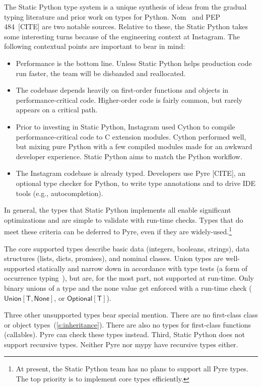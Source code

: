 \documentclass[english,cleveref,submission]{programming}
\newcommand{\SP}{Static Python}
\newcommand{\typefont}[1]{\mathsf{#1}}
\newcommand{\paramtype}[2]{#1[#2]}
\newcommand{\sptype}{\typefont{T}}
\newcommand{\sptnone}{\typefont{None}}
\newcommand{\sptoptional}[1]{\paramtype{\typefont{Optional}}{#1}}
\newcommand{\sptunion}[1]{\paramtype{\typefont{Union}}{#1}}
\begin{document}
The \SP{} type system is a unique synthesis of ideas from the gradual typing literature
and prior work on types for Python.
Nom~\cite{mt-oopsla-2017,mt-oopsla-2021} and PEP 484~[CITE] are two notable sources.
Relative to these, the \SP{} takes some interesting turns
because of the engineering context at Instagram.
The following contextual points are important to bear in mind:
\begin{itemize}
  \item
    Performance is the bottom line.
    Unless \SP{} helps production code run faster, the team will be disbanded
    and reallocated.
  \item
    The codebase depends heavily on first-order functions and objects in
    performance-critical code.
    Higher-order code is fairly common, but rarely appears on a critical path.
  \item
    Prior to investing in \SP{}, Instagram used Cython to compile
    performance-critical code to C extension modules.
    Cython performed well, but mixing pure Python with a few compiled modules
    made for an awkward developer experience.
    \SP{} aims to match the Python workflow.
  \item
    The Instagram codebase is already typed.
    Developers use Pyre [CITE], an optional type checker for Python,
    to write type annotations and to drive IDE tools (e.g., autocompletion).
\end{itemize}
%
In general, the types that \SP{} implements all enable significant optimizations
and are simple to validate with run-time checks.
Types that do meet these criteria can be deferred to Pyre, even if they are widely-used.\footnote{
At present, the \SP{} team
has no plans to support all Pyre types. The top priority is to implement
core types efficiently.}

The core supported types describe basic data (integers, booleans, strings),
data structures (lists, dicts, promises),
and nominal classes.
Union types are well-supported statically and narrow down in accordance
with type tests (a form of occurrence typing~\cite{tf-icfp-2010,gsk-esop-2011}),
but are, for the most part, not supported at run-time.
Only binary unions of a type and the none value get enforced with a run-time check
($\sptunion{\sptype, \sptnone}$, or $\sptoptional{\sptype}$).

Three other unsupported types bear special mention.
There are no first-class class or object types~(\cref{s:inheritance}).
There are also no types for first-class functions (callables).
Pyre can check these types instead.
Third, \SP{} does not support recursive types.
Neither Pyre nor mypy have recursive types either.
\end{document}
